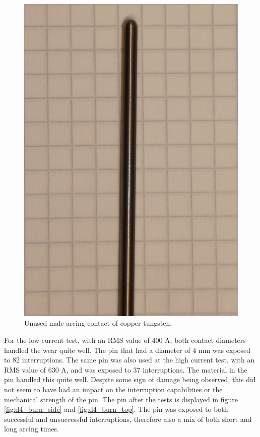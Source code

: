 \documentclass[10pt,a4paper,twoside]{article}
\begin{document}
\begin{figure}[H]
\centering
\includegraphics[scale=0.3]{Bilder/Discussion/d3_unused.png}
\caption{Unused male arcing contact of copper-tungsten.} \label{fig:unused_d3}
\end{figure}

For the low current test, with an RMS value of 400 A, both contact diameters handled the wear quite well. The pin that had a diameter of 4 mm was exposed to 82 interruptions. The same pin was also used at the high current test, with an RMS value of 630 A, and was exposed to 37 interruptions. The material in the pin handled this quite well. Despite some sign of damage being observed, this did not seem to have had an impact on the interruption capabilities or the mechanical strength of the pin. The pin after the tests is displayed in figure \ref{fig:d4_burn_side} and \ref{fig:d4_burn_top}. The pin was exposed to both successful and unsuccessful interruptions, therefore also a mix of both short and long arcing times.
\end{document}
